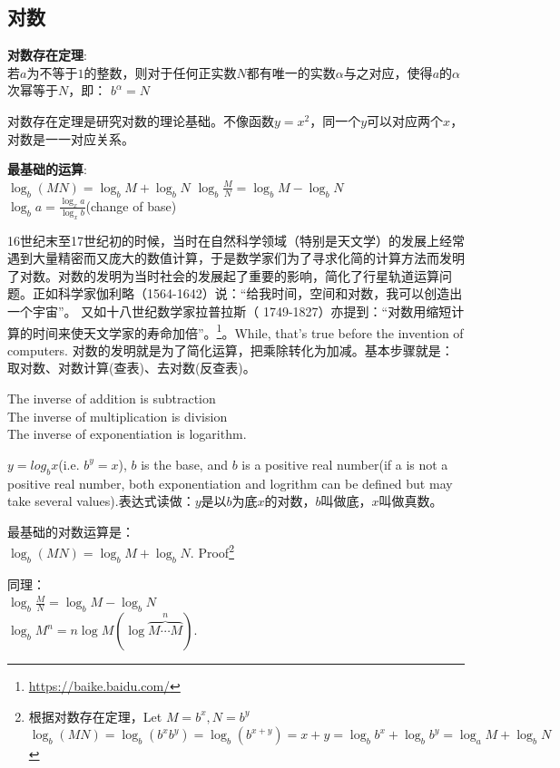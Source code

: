 \documentclass[../main.tex]{subfiles}
\begin{document}
\subsection{对数}

\begin{mdframed}
  \textbf{对数存在定理}:\\
  若$a$为不等于$1$的整数，则对于任何正实数$N$都有唯一的实数$\alpha$与之对应，使得$a$的$\alpha$次幂等于$N$，即：  $b^{\alpha}=N$
\end{mdframed}
对数存在定理是研究对数的理论基础。不像函数$y=x^2$，同一个$y$可以对应两个$x$，对数是一一对应关系。

\textbf{最基础的运算}:\\
$\log_b(MN)=\log_bM+\log_bN$ \phantom{xxx}  $\log_b \frac{M}{N} = \log_bM - \log_bN$\\
$\log_ba = \frac{\log_{x}a}{\log_{x}b}$(change of base)

16世纪末至17世纪初的时候，当时在自然科学领域（特别是天文学）的发展上经常遇到大量精密而又庞大的数值计算，于是数学家们为了寻求化简的计算方法而发明了对数。对数的发明为当时社会的发展起了重要的影响，简化了行星轨道运算问题。正如科学家伽利略（1564-1642）说：“给我时间，空间和对数，我可以创造出一个宇宙”。 又如十八世纪数学家拉普拉斯（ 1749-1827）亦提到：“对数用缩短计算的时间来使天文学家的寿命加倍”。\footnote{\url{https://baike.baidu.com/}}。While, that's true before the invention of computers. 对数的发明就是为了简化运算，把乘除转化为加减。基本步骤就是：取对数、对数计算(查表)、去对数(反查表)。

The inverse of addition is subtraction\\
The inverse of multiplication is division\\
The inverse of exponentiation is logarithm.

$y=log_bx$(i.e. $b^y=x$), $b$ is the base, and $b$ is a positive real number(if a is not a positive real number, both exponentiation and logrithm can be defined but may take several values).表达式读做：$y$是以$b$为底$x$的对数，$b$叫做底，$x$叫做真数。

最基础的对数运算是：\\
$\log_b(MN)=\log_bM + \log_bN$.
Proof\footnote{根据对数存在定理，Let $M=b^x, N=b^y$\\
$\log_b(MN)=\log_b(b^xb^y)=\log_b(b^{x+y})=x+y=\log_b b^x+\log_b b^y=\log_aM + \log_bN$}

同理：\\
$\log_b \frac{M}{N} =\log_bM - \log_bN$\\
$\log_bM^n =n\log M(\log \overbrace{M\cdots M}^n)$.
\end{document}
